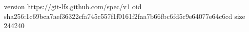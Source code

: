 version https://git-lfs.github.com/spec/v1
oid sha256:1c69bca7aef36322cfa745c557f1f0161f2faa7b66fbc6fd5c9e64077e64c6cd
size 244240
